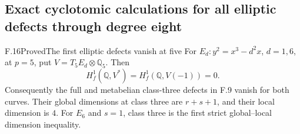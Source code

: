 \subsection{Exact cyclotomic calculations for all elliptic defects through degree eight}

\begin{statement}{F.16}{Proved}{The first elliptic defects vanish at five}
For $E_d:y^2=x^3-d^2x$, $d=1,6$, at $p=5$, put
$V=T_5E_d\otimes\mathbb Q_5$. Then
\[
 H_f^1(\mathbb Q,V^*)=H_f^1(\mathbb Q,V(-1))=0.
\]
Consequently the full and metabelian class-three defects in F.9
vanish for both curves. Their global dimensions at class three are
$r+s+1$, and their local dimension is $4$. For $E_6$ and $s=1$, class three
is the first strict global--local dimension inequality.
\end{statement}

